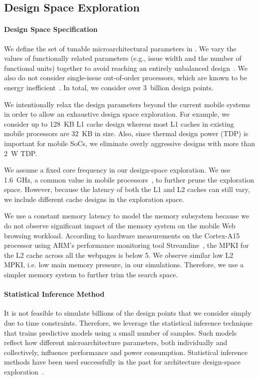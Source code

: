 \subsection{Design Space Exploration}
\label{sec:arch:customization:dse}

\paragraph{Design Space Specification} We define the set of tunable microarchitectural parameters in . We vary the values of functionally related parameters (e.g., issue width and the number of functional units) together to avoid reaching an entirely unbalanced design~\cite{ilp2}. We also do not consider single-issue out-of-order processors, which are known to be energy inefficient~\cite{marginal}. In total, we consider over 3~billion design points.



We intentionally relax the design parameters beyond the current mobile systems in order to allow an exhaustive design space exploration. For example, we consider up to 128~KB L1 cache design whereas most L1 caches in existing mobile processors are 32~KB in size. Also, since thermal design power (TDP) is important for mobile SoCs, we eliminate overly aggressive designs with more than 2~W TDP.

We assume a fixed core frequency in our design-space exploration. We use 1.6~GHz, a common value in mobile processors~\cite{snapdragon-wiki,exynos-wiki}, to further prune the exploration space. However, because the latency of both the L1 and L2 caches can still vary, we include different cache designs in the exploration space.

We use a constant memory latency to model the memory subsystem because we do not observe significant impact of the memory system on the mobile Web browsing workload. According to hardware measurements on the Cortex-A15 processor using ARM's performance monitoring tool Streamline~\cite{streamline}, the MPKI for the L2 cache across all the webpages is below 5. We observe similar low L2 MPKI, i.e. low main memory pressure, in our simulations. Therefore, we use a simpler memory system to further trim the search space.

\paragraph{Statistical Inference Method} It is not feasible to simulate billions of the design points that we consider simply due to time constraints. Therefore, we leverage the statistical inference technique that trains predictive models using a small number of samples. Such models reflect how different microarchitecture parameters, both individually and collectively, influence performance and power consumption. Statistical inference methods have been used successfully in the past for architecture design-space exploration~\cite{dse,comt}.

